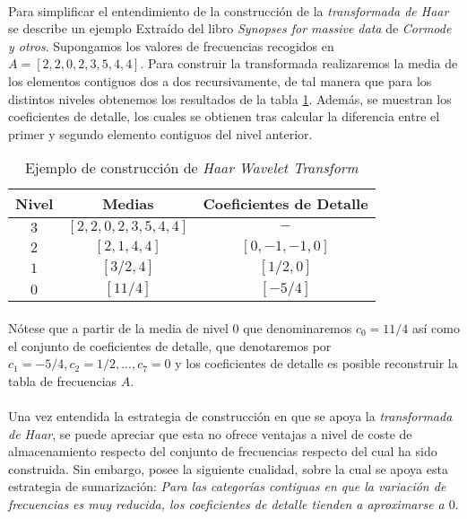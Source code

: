 \documentclass{subfiles}
\begin{document}
          \paragraph{}
          Para simplificar el entendimiento de la construcción de la \emph{transformada de Haar} se describe un ejemplo Extraído del libro \emph{Synopses for massive data} \cite{cormode2012synopses} de \emph{Cormode y otros}. Supongamos los valores de frecuencias recogidos en $A = [2,2,0,2,3,5,4,4]$. Para construir la transformada realizaremos la media de los elementos contiguos dos a dos recursivamente, de tal manera que para los distintos niveles obtenemos los resultados de la tabla \ref{table:wavelet_example}. Además, se muestran los coeficientes de detalle, los cuales se obtienen tras calcular la diferencia entre el primer y segundo elemento contiguos del nivel anterior.

          \begin{table}[H]
            \centering
            \begin{tabular}{| c | c | c |}
              \hline
              Nivel & Medias & Coeficientes de Detalle  \\ \hline \hline
              $3$ & $[2,2,0,2,3,5,4,4]$ & $-$         \\ \hline
              $2$ & $[2,1,4,4]$         & $[0,-1,-1,0]$ \\ \hline
              $1$ & $[3/2,4]$           & $[1/2, 0]$    \\ \hline
              $0$ & $[11/4]$            & $[-5/4]$      \\
              \hline
            \end{tabular}
            \caption{Ejemplo de construcción de \emph{Haar Wavelet Transform}}
            \label{table:wavelet_example}
          \end{table}

          \paragraph{}
          Nótese que a partir de la media de nivel 0 que denominaremos $c_0 = 11/4$ así como el conjunto de coeficientes de detalle, que denotaremos por $c_1 = -5/4, c_2 = 1/2, ..., c_7 = 0$ y los coeficientes de detalle es posible reconstruir la tabla de frecuencias $A$.

        \paragraph{}
        Una vez entendida la estrategia de construcción en que se apoya la \emph{transformada de Haar}, se puede apreciar que esta no ofrece ventajas a nivel de coste de almacenamiento respecto del conjunto de frecuencias respecto del cual ha sido construida. Sin embargo, posee la siguiente cualidad, sobre la cual se apoya esta estrategia de sumarización: \emph{Para las categorías contiguas en que la variación de frecuencias es muy reducida, los coeficientes de detalle tienden a aproximarse a $0$}.
\end{document}
